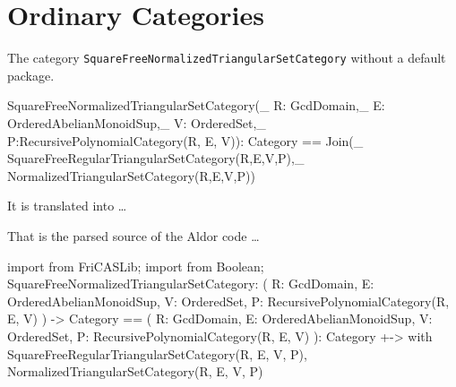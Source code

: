 \documentclass{article}
\begin{document}
\section{Ordinary Categories}\label{sec:Category}
The category \verb'SquareFreeNormalizedTriangularSetCategory' without
a default package.
\begin{code}
SquareFreeNormalizedTriangularSetCategory(_
        R: GcdDomain,_
        E: OrderedAbelianMonoidSup,_
        V: OrderedSet,_
        P:RecursivePolynomialCategory(R, E, V)): Category ==
    Join(_
        SquareFreeRegularTriangularSetCategory(R,E,V,P),_
         NormalizedTriangularSetCategory(R,E,V,P))
\end{code}
It is translated into \ldots
{}
That is the parsed source of the Aldor code \ldots
\begin{code}
import from FriCASLib;
import from Boolean;
SquareFreeNormalizedTriangularSetCategory: (
        R: GcdDomain,
        E: OrderedAbelianMonoidSup,
        V: OrderedSet,
        P: RecursivePolynomialCategory(R, E, V)
) -> Category == (
        R: GcdDomain,
        E: OrderedAbelianMonoidSup,
        V: OrderedSet,
        P: RecursivePolynomialCategory(R, E, V)
): Category +-> with {
        SquareFreeRegularTriangularSetCategory(R, E, V, P),
        NormalizedTriangularSetCategory(R, E, V, P)
}
\end{code}
\end{document}

